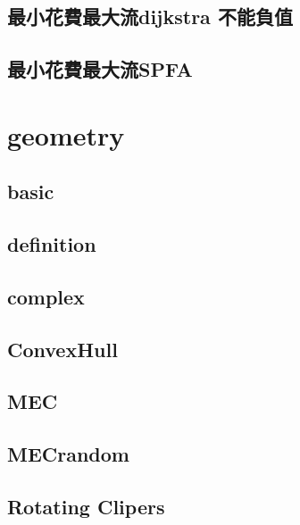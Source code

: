 \documentclass[a4paper,10pt,twocolumn,oneside]{article}
\begin{document}
    \subsection{最小花費最大流dijkstra 不能負值}
    

    \subsection{最小花費最大流SPFA}
    

\section{geometry}
    \subsection{basic}
    

    \subsection{definition}
    
    
    \subsection{complex}
    

    \subsection{ConvexHull}
    

    \subsection{MEC}
    

    \subsection{MECrandom}
    

    \subsection{Rotating Clipers}
    
\end{document}
